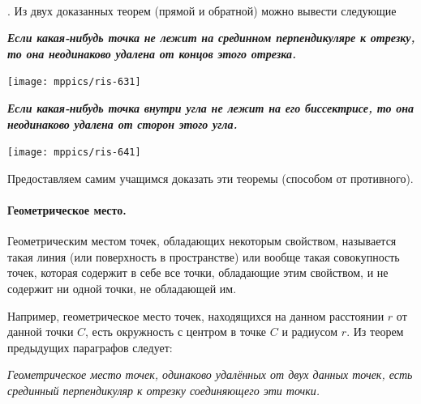 \documentclass[oneside]{book}
\begin{document}
\paragraph{}\label{1938/59}
.
Из двух доказанных теорем (прямой и обратной) можно вывести следующие 

\medskip

\begin{paracol}{2}

{\sloppy
\textbf{\emph{Если какая-нибудь точка не лежит на срединном перпендикуляре к отрезку, то она неодинаково удалена от концов этого отрезка.}}

\medskip

{\centering
\texttt{[image: mppics/ris-631]}
\label{1931/ris-62}
\addtocounter{figure}{1}
}

}

\switchcolumn

{\sloppy

\textbf{\emph{Если какая-нибудь точка внутри угла не лежит на его биссектрисе, то она неодинаково удалена от сторон этого угла.}}

\medskip

{\centering
\texttt{[image: mppics/ris-641]}
\label{1931/ris-63}
\addtocounter{figure}{1}
}

}

\end{paracol}

\medskip

Предоставляем самим учащимся доказать эти теоремы (способом от противного).

\paragraph{Геометрическое место.}\label{1938/60}
Геометрическим местом точек, обладающих некоторым свойством, называется такая линия (или поверхность в пространстве) или вообще такая совокупность точек, которая содержит в себе все точки, обладающие этим свойством, и не содержит ни одной точки, не обладающей им.

Например, геометрическое место точек, находящихся на данном расстоянии $r$ от данной точки $C$, есть окружность с центром в точке $C$ и радиусом $r$.
Из теорем предыдущих параграфов следует:

\emph{Геометрическое место точек, одинаково удалённых от двух данных точек, есть срединный перпендикуляр к отрезку соединяющего эти точки.} 
\end{document}
